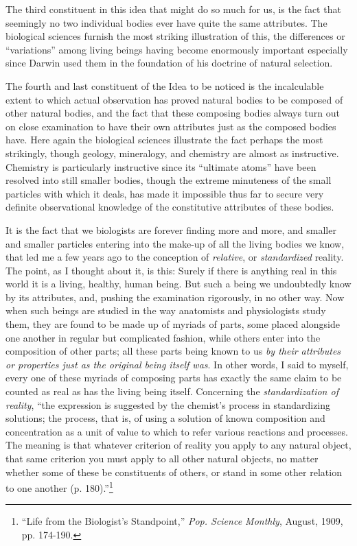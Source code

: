 \documentclass[a4paper, 11pt, oneside, polutonikogreek, english]{article}
\begin{document}
The third constituent in this idea that might do so much for us, is the fact that seemingly no two individual bodies ever have quite the same attributes. The biological sciences furnish the most striking illustration of this, the differences or ``variations'' among living beings having become enormously important especially since Darwin used them in the foundation of his doctrine of natural selection.

The fourth and last constituent of the Idea to be noticed is the incalculable extent to which actual observation has proved natural bodies to be composed of other natural bodies, and the fact that these composing bodies always turn out on close examination to have their own attributes just as the composed bodies have. Here again the biological sciences illustrate the fact perhaps the most strikingly, though geology, mineralogy, and chemistry are almost as instructive. Chemistry is particularly instructive since its ``ultimate atoms'' have been resolved into still smaller bodies, though the extreme minuteness of the small particles with which it deals, has made it impossible thus far to secure very definite observational knowledge of the constitutive attributes of these bodies.

It is the fact that we biologists are forever finding more and more, and smaller and smaller particles entering into the make-up of all the living bodies we know, that led me a few years ago to the conception of \emph{relative}, or \emph{standardized} reality. The point, as I thought about it, is this: Surely if there is anything real in this world it is a living, healthy, human being. But such a being we undoubtedly know by its attributes, and, pushing the examination rigorously, in no other way. Now when such beings are studied in the way anatomists and physiologists study them, they are found to be made up of myriads of parts, some placed alongside one another in regular but complicated fashion, while others enter into the composition of other parts; all these parts being known to us \emph{by their attributes or properties just as the original being itself was}. In other words, I said to myself, every one of these myriads of composing parts has exactly the same claim to be counted as real as has the living being itself. Concerning the \emph{standardization of reality}, ``the expression is suggested by the chemist's process in standardizing solutions; the process, that is, of using a solution of known composition and concentration as a unit of value to which to refer various reactions and processes. The meaning is that whatever criterion of reality you apply to any natural object, that same criterion you must apply to all other natural objects, no matter whether some of these be constituents of others, or stand in some other relation to one another (p. 180).''\footnote{``Life from the Biologist's Standpoint,'' \emph{Pop. Science Monthly}, August, 1909, pp. 174-190.}
\end{document}
